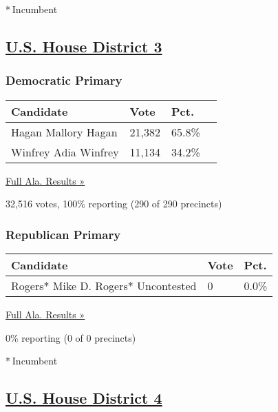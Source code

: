 * Incumbent

\hypertarget{us-house-district-3}{%
\subsection{\texorpdfstring{\href{https://www.nytimes3xbfgragh.onion/elections/results/alabama-house-district-3-primary-election}{U.S.
House District 3}}{U.S. House District 3}}\label{us-house-district-3}}

\hypertarget{democratic-primary-3}{%
\subsubsection{Democratic Primary}\label{democratic-primary-3}}

\begin{longtable}[]{@{}llll@{}}
\toprule
Candidate & Vote & Pct. &\tabularnewline
\midrule
\endhead
 Hagan Mallory Hagan & 21,382 & 65.8\% &\tabularnewline
 Winfrey Adia Winfrey & 11,134 & 34.2\% &\tabularnewline
\bottomrule
\end{longtable}

\href{https://www.nytimes3xbfgragh.onion/elections/results/alabama}{Full
Ala. Results »}

32,516 votes, 100\% reporting (290 of 290 precincts)

\hypertarget{republican-primary-3}{%
\subsubsection{Republican Primary}\label{republican-primary-3}}

\begin{longtable}[]{@{}lll@{}}
\toprule
Candidate & Vote & Pct.\tabularnewline
\midrule
\endhead
 Rogers* Mike D. Rogers* Uncontested & 0 & 0.0\%\tabularnewline
\bottomrule
\end{longtable}

\href{https://www.nytimes3xbfgragh.onion/elections/results/alabama}{Full
Ala. Results »}

0\% reporting (0 of 0 precincts)

* Incumbent

\hypertarget{us-house-district-4}{%
\subsection{\texorpdfstring{\href{https://www.nytimes3xbfgragh.onion/elections/results/alabama-house-district-4-primary-election}{U.S.
House District 4}}{U.S. House District 4}}\label{us-house-district-4}}

